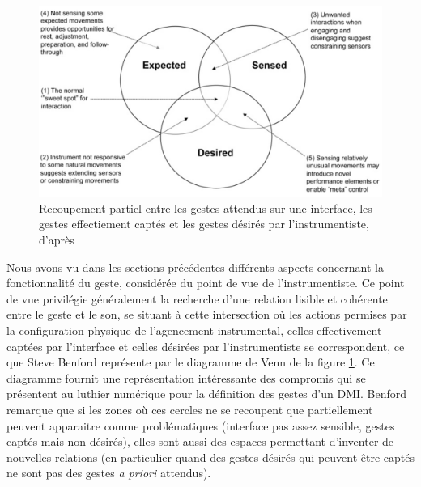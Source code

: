 \begin{figure}[!ht]
	\captionsetup{format=plain}%
	  \includegraphics[width=\linewidth]{gfx/03_gesture/Benford_expected-sensed-desired.png}
		\caption[Recoupement partiel entre les gestes attendus sur une interface, les gestes désirés par l'instrumentiste, et les gestes effectiement captés]{Recoupement partiel entre les gestes attendus sur une interface, les gestes effectiement captés et les gestes désirés par l'instrumentiste, d'après \cite{benford_performing_2010}}
		\label{fig:Benford_expected-sensed-desired}
\end{figure}
\noindent Nous avons vu dans les sections précédentes différents aspects concernant la fonctionnalité du geste, considérée du point de vue de l'instrumentiste. Ce point de vue privilégie généralement la recherche d'une relation lisible et cohérente entre le geste et le son, se situant à cette intersection où les actions permises par la configuration physique de l'agencement instrumental, celles effectivement captées par l'interface et celles désirées par l'instrumentiste se correspondent, ce que Steve Benford représente par le diagramme de Venn de la figure \ref{fig:Benford_expected-sensed-desired}. Ce diagramme fournit une représentation intéressante des compromis qui se présentent au luthier numérique pour la définition des gestes d'un \gls{DMI}. Benford remarque que si les zones où ces cercles ne se recoupent que partiellement peuvent apparaitre comme problématiques (interface pas assez sensible, gestes captés mais non-désirés), elles sont aussi des espaces permettant d'inventer de nouvelles relations (en particulier quand des gestes désirés qui peuvent être captés ne sont pas des gestes \textit{a priori} attendus).\\
